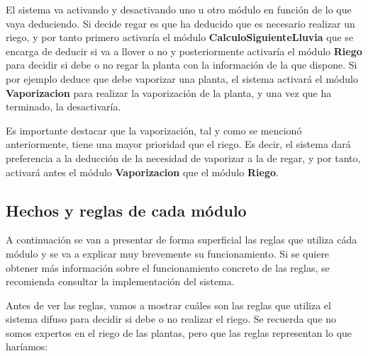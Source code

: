 \documentclass[11pt,a4paper]{article}
\begin{document}
El sistema va activando y desactivando uno u otro módulo en función de lo que vaya deduciendo. Si decide regar es que ha deducido
que es necesario realizar un riego, y por tanto primero activaría el módulo \textbf{CalculoSiguienteLluvia} que se encarga de
deducir si va a llover o no y posteriormente activaría el módulo \textbf{Riego} para decidir si debe o no regar la planta con la
información de la que dispone. Si por ejemplo deduce que debe vaporizar una planta, el sistema activará el módulo
\textbf{Vaporizacion} para realizar la vaporización de la planta, y una vez que ha terminado, la desactivaría.

Es importante destacar que la vaporización, tal y como se mencionó anteriormente, tiene una mayor prioridad que el riego. Es decir,
el sistema dará preferencia a la deducción de la necesidad de vaporizar a la de regar, y por tanto, activará antes el módulo
\textbf{Vaporizacion} que el módulo \textbf{Riego}.

\subsection{Hechos y reglas de cada módulo}

A continuación se van a presentar de forma superficial las reglas que utiliza cáda módulo y se va a explicar muy brevemente
su funcionamiento. Si se quiere obtener más información sobre el funcionamiento concreto de las reglas, se recomienda consultar
la implementación del sistema.

Antes de ver las reglas, vamos a mostrar cuáles son las reglas que utiliza el sistema difuso para decidir si debe o no realizar
el riego. Se recuerda que no somos expertos en el riego de las plantas, pero que las reglas representan lo que haríamos:
\end{document}
